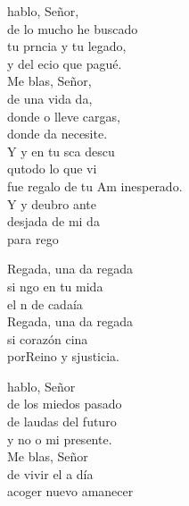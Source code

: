 \begin{cancion}[Regalada][Ixcís]%
	 hablo,	Señor,\\
	de lo mucho he buscado\\
	tu prncia y tu	legado,\\
	y del ecio	que	pagué.\\
	\jump
	Me blas,	Señor,\\
	de una vida da,\\
	donde o lleve	cargas,	\\
	donde da	necesite.\\
	\jump
	Y y en tu sca descu \\
	qutodo lo que vi\\
	fue regalo de tu Am inesperado.\\
	\jump
	Y y deubro ante \\
	desjada de mi da\\
	para  rego\jump\\
	\begin{chorus}%
		Regada, una da regada\\
		si ngo en tu mida \\
		el n de cadaía\\
		Regada, una da regada\\
		si  corazón cina \\
		porReino y sjusticia.\jump\\
	\end{chorus}%
	 hablo, Señor\\
	de los miedos pasado\\
	de laudas del futuro\\
	y no o mi presente.\\
	\jump
	Me blas, Señor\\
	de vivir el  a día\\
	acoger nuevo amanecer\\

\end{cancion}
